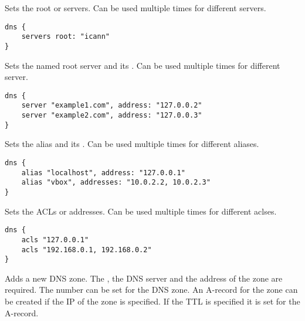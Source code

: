 
Sets the root  or servers. Can be used multiple times
for different servers.

\begin{lstlisting}[style=Java]
dns {
    servers root: "icann"
}
\end{lstlisting}


Sets the named root server  and its . Can be used multiple times
for different server.

\begin{lstlisting}[style=Java]
dns {
    server "example1.com", address: "127.0.0.2"
    server "example2.com", address: "127.0.0.3"
}
\end{lstlisting}


Sets the alias  and its . Can be used multiple times
for different aliases.

\begin{lstlisting}[style=Java]
dns {
    alias "localhost", address: "127.0.0.1"
    alias "vbox", addresses: "10.0.2.2, 10.0.2.3"
}
\end{lstlisting}


Sets the ACLs  or addresses. Can be used multiple times
for different aclses.

\begin{lstlisting}[style=Java]
dns {
    acls "127.0.0.1"
    acls "192.168.0.1, 192.168.0.2"
}
\end{lstlisting}


Adds a new DNS zone. The , the  DNS server and 
the  address of the zone are required. The  number can
be set for the DNS zone.
An A-record for the zone
can be created if the IP  of the zone is specified. If the
TTL  is specified it is set for the A-record.

